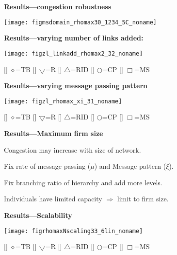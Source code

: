   


  \textbf{Results---congestion robustness}
  \begin{center}
    \texttt{[image: figmsdomain\_rhomax30\_1234\_5C\_noname]}
  \end{center}

  \textbf{Results---varying number of links added:}

      
    \texttt{[image: figzl\_linkadd\_rhomax2\_32\_noname]}
    
    
    [] 
        {\Large$\diamond$}=TB
    []
        $\bigtriangledown$=R
    []
        $\bigtriangleup$=RID 
    []
        {\small$\bigcirc$}=CP
    []
        $\Box$=MS 
    
  

  \textbf{Results---varying message passing pattern}

      
    \texttt{[image: figzl\_rhomax\_xi\_31\_noname]}
    
    
    [] 
        {\Large$\diamond$}=TB
    []
        $\bigtriangledown$=R
    []
        $\bigtriangleup$=RID 
    []
        {\small$\bigcirc$}=CP
    []
        $\Box$=MS 
    
  


  \textbf{Results---Maximum firm size}

  
  
    Congestion may increase with size
    of network.
   
    Fix rate of message passing ($\mu$)
    and
    Message pattern ($\xi$).
  
    Fix branching ratio of hierarchy  and add more levels.
   
    Individuals have limited capacity 
    $\Rightarrow$ limit to firm size.
  



  \textbf{Results---Scalability}

      
    \texttt{[image: figrhomaxNscaling33\_6lin\_noname]}
    
    
    [] 
        {\Large$\diamond$}=TB
    []
        $\bigtriangledown$=R
    []
        $\bigtriangleup$=RID 
    []
        {\small$\bigcirc$}=CP
    []
        $\Box$=MS 
    

